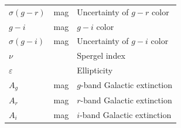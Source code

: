 \documentclass[twocolumn,astrosymb,twocolappendix]{aastex631}
\begin{document}
\begin{CJK*}{UTF8}{gbsn}
\begin{table}
\begin{center}
\begin{tabular}{l l l}
$\sigma(g-r)$           & mag     & Uncertainty of $g-r$ color      \\
$g-i$                    & mag     & $g-i$ color                     \\
$\sigma(g-i)$           & mag     & Uncertainty of $g-i$ color      \\
$\nu$                    &         & Spergel index              \\
$\varepsilon$               &         & Ellipticity                     \\
$A_g$                    & mag     & $g$-band Galactic extinction \\
$A_r$                    & mag     & $r$-band Galactic extinction \\
$A_i$                    & mag     & $i$-band Galactic extinction \\
\hline\hline
\end{tabular}
\end{center}
\end{table}


\end{CJK*}
\end{document}
